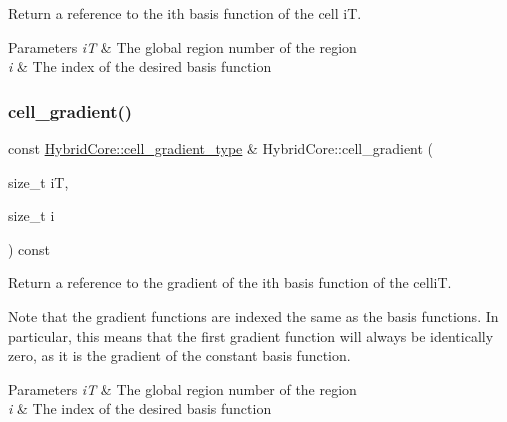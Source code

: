 Return a reference to the i\textquotesingle{}th basis function of the cell iT. 


\begin{DoxyParams}{Parameters}
{\em iT} & The global region number of the region \\
\hline
{\em i} & The index of the desired basis function \\
\hline
\end{DoxyParams}
\mbox{\label{classHCore2D_1_1HybridCore_a710fc23b914623b90a2699ab4291e539}} 
\subsubsection{\texorpdfstring{cell\+\_\+gradient()}{cell\_gradient()}}
{\footnotesize\ttfamily const \hyperlink{classHCore2D_1_1HybridCore_ae6a6ebafdb90354417d0068dd75134cd}{Hybrid\+Core\+::cell\+\_\+gradient\+\_\+type} \& Hybrid\+Core\+::cell\+\_\+gradient (\begin{DoxyParamCaption}\item[{size\+\_\+t}]{iT,  }\item[{size\+\_\+t}]{i }\end{DoxyParamCaption}) const}



Return a reference to the gradient of the i\textquotesingle{}th basis function of the celliT. 

Note that the gradient functions are indexed the same as the basis functions. In particular, this means that the first gradient function will always be identically zero, as it is the gradient of the constant basis function. 
\begin{DoxyParams}{Parameters}
{\em iT} & The global region number of the region \\
\hline
{\em i} & The index of the desired basis function \\
\hline
\end{DoxyParams}
\mbox{\label{classHCore2D_1_1HybridCore_a9ecd6ca61d4f9e3f3e3af81d8de394d0}} 
